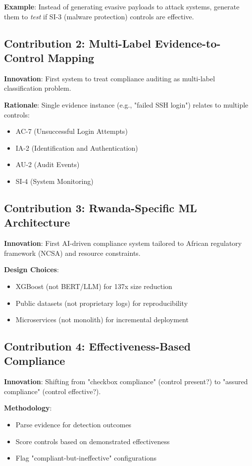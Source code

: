 \documentclass[11pt,conference]{IEEEtran}
\begin{document}
\textbf{Example}: Instead of generating evasive payloads to attack systems, generate them to \textit{test} if SI-3 (malware protection) controls are effective.

\subsection{Contribution 2: Multi-Label Evidence-to-Control Mapping}

\textbf{Innovation}: First system to treat compliance auditing as multi-label classification problem.

\textbf{Rationale}: Single evidence instance (e.g., "failed SSH login") relates to multiple controls:
\begin{itemize}
    \item AC-7 (Unsuccessful Login Attempts)
    \item IA-2 (Identification and Authentication)
    \item AU-2 (Audit Events)
    \item SI-4 (System Monitoring)
\end{itemize}

\subsection{Contribution 3: Rwanda-Specific ML Architecture}

\textbf{Innovation}: First AI-driven compliance system tailored to African regulatory framework (NCSA) and resource constraints.

\textbf{Design Choices}:
\begin{itemize}
    \item XGBoost (not BERT/LLM) for 137x size reduction
    \item Public datasets (not proprietary logs) for reproducibility
    \item Microservices (not monolith) for incremental deployment
\end{itemize}

\subsection{Contribution 4: Effectiveness-Based Compliance}

\textbf{Innovation}: Shifting from "checkbox compliance" (control present?) to "assured compliance" (control effective?).

\textbf{Methodology}:
\begin{itemize}
    \item Parse evidence for detection outcomes
    \item Score controls based on demonstrated effectiveness
    \item Flag "compliant-but-ineffective" configurations
\end{itemize}
\end{document}
